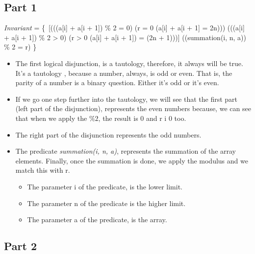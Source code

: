 \documentclass[a4paper,12pt]{article}
\begin{document}
\subsection{Part 1}
\begin{center}
    
    \textit{Invariant} =  \{\ [(((a[i] + a[i + 1]) \% 2 = 0) \longrightarrow (r = 0 \wedge (a[i] + a[i + 1] = 2n))) \vee (((a[i] + a[i + 1]) \% 2 > 0) \longrightarrow (r > 0 \vee  (a[i] + a[i + 1]) = (2n + 1)))] \wedge ((summation(i, n, a)) \% 2 = r) \}\
    
\end{center}

\begin{itemize}[label = {\clubsuit}]

    \item The first logical disjunction, is a tautology, therefore, it always will be true. It's a tautology , because a number, always, is odd or even. That is, the parity of a number is a binary question. Either it's odd or it's even.
    \item If we go one step further into the tautology, we will see that the first part (left part of the disjunction), represents the even numbers because, we can see that when we apply the $\%2$, the result is 0 and r i 0 too.
    \item The right part of the disjunction represents the odd numbers.
    \item The predicate \textit{summation(i, n, a)}, represents the summation of the array elements. Finally, once the summation is done, we apply the modulus and we match this with r.
    
    \begin{itemize}
    
        \item The parameter i of the predicate, is the lower limit.
        \item The parameter n of the predicate is the higher limit.
        \item The parameter a of the predicate, is the array.
        
    \end{itemize}
    
\end{itemize}

\subsection{Part 2}
\end{document}
